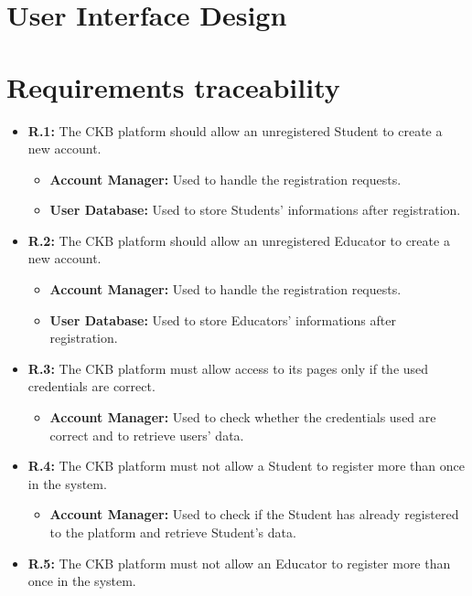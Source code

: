\documentclass{article}
\begin{document}
{\newpage
\pagestyle{UserInterfaceStyle}
\section{User Interface Design}
\newpage
\pagestyle{RequirementsTraceabilityStyle}
\section{Requirements traceability}
\begin{itemize}
    \item \textbf{R.1:} The CKB platform should allow an
        unregistered Student to create a new account.
        \begin{itemize}
            \item \textbf{Account Manager:} Used to handle the registration requests.
            \item \textbf{User Database:} Used to store Students' informations after registration.
        \end{itemize}
    \item \textbf{R.2:} The CKB platform should allow an
        unregistered Educator to create a new account.
        \begin{itemize}
            \item \textbf{Account Manager:} Used to handle the registration requests.
            \item \textbf{User Database:} Used to store Educators' informations after registration.
        \end{itemize}
    \item \textbf{R.3:} The CKB platform must allow access to its pages only if the used credentials are correct.
        \begin{itemize}
            \item \textbf{Account Manager:} Used to check whether the credentials used are correct and to retrieve users' data.
        \end{itemize}
    \item \textbf{R.4:} The CKB platform must not allow a Student to register more than once in the system.
          \begin{itemize}
              \item \textbf{Account Manager:} Used to check if the Student has 
              already registered to the platform and retrieve Student's data.
          \end{itemize}
    \item \textbf{R.5:} The CKB platform must not allow an Educator to register more than once in the system.

\end{itemize}}
\end{document}
